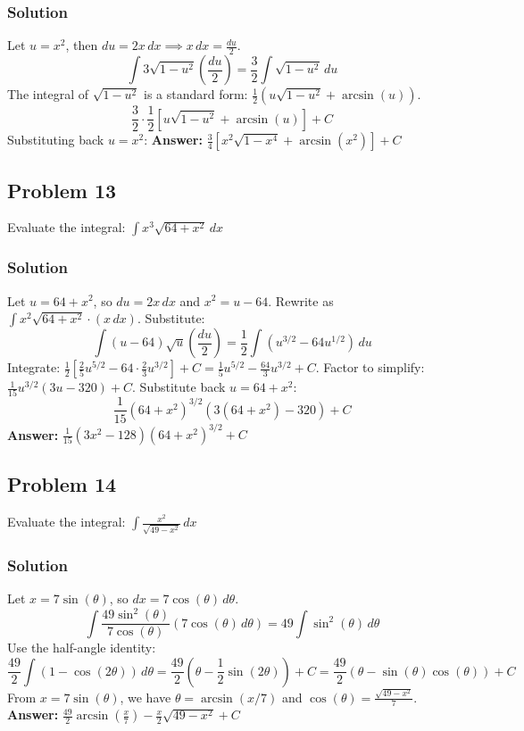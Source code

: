 \documentclass{article}
\begin{document}
\subsubsection*{Solution}
Let $ u = x^2 $, then $ du = 2x \,dx \implies x \,dx = \frac{du}{2} $.
\[ \int 3\sqrt{1 - u^2} \left(\frac{du}{2}\right) = \frac{3}{2} \int \sqrt{1 - u^2} \,du \]
The integral of $ \sqrt{1-u^2} $ is a standard form: $ \frac{1}{2}(u\sqrt{1-u^2} + \arcsin(u)) $.
\[ \frac{3}{2} \cdot \frac{1}{2}[u\sqrt{1 - u^2} + \arcsin(u)] + C \]
Substituting back $ u = x^2 $:
\textbf{Answer:} $ \frac{3}{4}[x^2\sqrt{1 - x^4} + \arcsin(x^2)] + C $


\subsection{Problem 13}
Evaluate the integral: $ \int x^3\sqrt{64 + x^2} \,dx $
\subsubsection*{Solution}
Let $ u = 64 + x^2 $, so $ du = 2x \,dx $ and $ x^2 = u - 64 $.
Rewrite as $ \int x^2\sqrt{64 + x^2} \cdot (x \,dx) $. Substitute:
\[ \int (u - 64)\sqrt{u} \left(\frac{du}{2}\right) = \frac{1}{2} \int (u^{3/2} - 64u^{1/2}) \,du \]
Integrate: $ \frac{1}{2}\left[\frac{2}{5}u^{5/2} - 64 \cdot \frac{2}{3}u^{3/2}\right] + C = \frac{1}{5}u^{5/2} - \frac{64}{3}u^{3/2} + C $.
Factor to simplify: $ \frac{1}{15}u^{3/2}(3u - 320) + C $. Substitute back $ u = 64 + x^2 $:
\[ \frac{1}{15}(64+x^2)^{3/2}(3(64+x^2) - 320) + C \]
\textbf{Answer:} $ \frac{1}{15}(3x^2 - 128)(64 + x^2)^{3/2} + C $


\subsection{Problem 14}
Evaluate the integral: $ \int \frac{x^2}{\sqrt{49 - x^2}} \,dx $
\subsubsection*{Solution}
Let $ x = 7 \sin(\theta) $, so $ dx = 7 \cos(\theta) \,d\theta $.
\[ \int \frac{49\sin^2(\theta)}{7\cos(\theta)} (7\cos(\theta) \,d\theta) = 49 \int \sin^2(\theta) \,d\theta \]
Use the half-angle identity:
\[ \frac{49}{2} \int (1 - \cos(2\theta)) \,d\theta = \frac{49}{2}\left(\theta - \frac{1}{2}\sin(2\theta)\right) + C = \frac{49}{2}(\theta - \sin(\theta)\cos(\theta)) + C \]
From $ x=7\sin(\theta) $, we have $ \theta=\arcsin(x/7) $ and $ \cos(\theta)=\frac{\sqrt{49-x^2}}{7} $.
\textbf{Answer:} $ \frac{49}{2}\arcsin\left(\frac{x}{7}\right) - \frac{x}{2}\sqrt{49 - x^2} + C $
\end{document}
